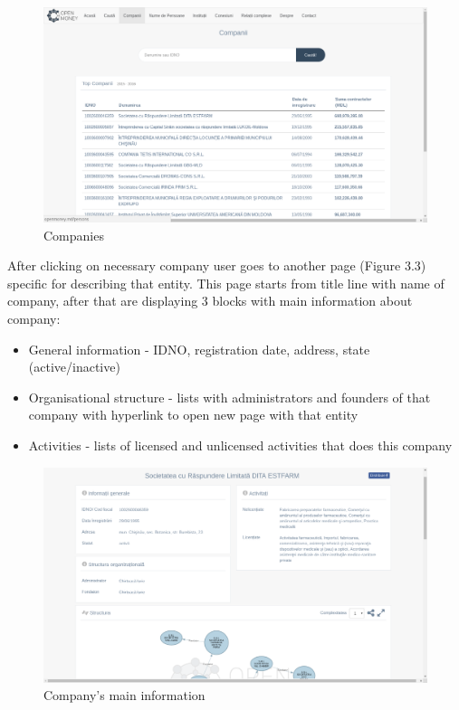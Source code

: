 \documentclass[12pt,a4paper,titlepage]{article}
\begin{document}
	\begin{figure}[!ht] 
	\renewcommand\thefigure{3.2} %
	\centering 
	\includegraphics[width=17cm]{companies.png} 
	\caption{ Companies }\label{fig4} 
	\end{figure}
	
After clicking on necessary company user goes to another page (Figure 3.3) specific for describing that entity. This page starts from title line with name of company, after that are displaying 3 blocks with main information about company:
\begin{itemize}
\item General information - IDNO, registration date, address, state (active/inactive)
\item Organisational structure - lists with administrators and founders of that company with hyperlink to open new page with that entity
\item Activities - lists of licensed and unlicensed activities that does this company\\
\end{itemize}

	\newpage
	\begin{figure}[!ht] 
	\renewcommand\thefigure{3.3} %
	\centering 
	\includegraphics[width=17cm]{company_info.png} 
	\caption{ Company's main information }\label{fig4} 
	\end{figure}
	
\end{document}
